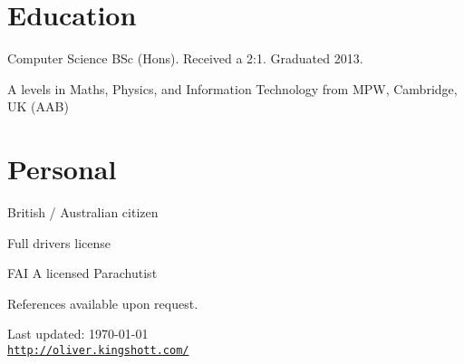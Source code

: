 \documentclass[a4paper]{article}
\def\footerlink{http://oliver.kingshott.com/}
\renewenvironment{itemize}{
  \begin{list}{}{
    \setlength{\leftmargin}{1.5em}
  }
}{
  \end{list}
}
\begin{document}
\section*{Education}
\begin{itemize}
  \item Computer Science BSc (Hons). Received a 2:1. Graduated 2013. 
  \item A levels in Maths, Physics, and Information Technology from MPW, Cambridge, UK (AAB)
\end{itemize}

\section*{Personal}

\begin{itemize}
\item British / Australian citizen
\item Full drivers license
\item FAI A licensed Parachutist
\item References available upon request.
\end{itemize}

\bigskip

\begin{center}
  \begin{footnotesize}
    Last updated: \today \\
    \href{\footerlink}{\texttt{\footerlink}}
  \end{footnotesize}
\end{center}
\end{document}

